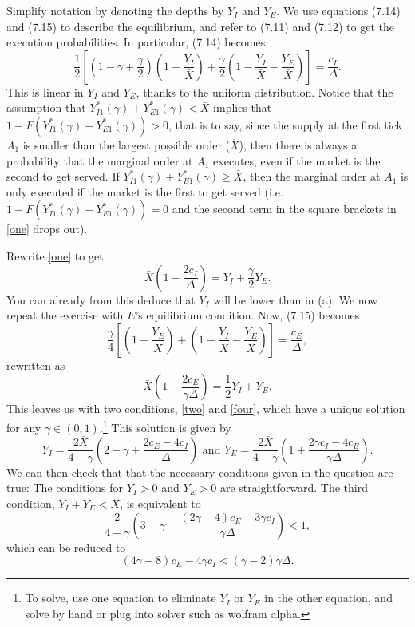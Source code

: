 \documentclass[11pt
, answers
]{exam}
\begin{document}
\begin{enumerate}[label=(\alph*). ]
	\begin{solution}
		Simplify notation by denoting the depths by $Y_{I}$ and $Y_{E}$. We use equations (7.14) and (7.15) to describe the equilibrium, and refer to (7.11) and (7.12) to get the execution probabilities. In particular, (7.14) becomes
		\begin{equation} \label{one}
			\frac{1}{2} \left[ \left( 1-\gamma+\frac{\gamma}{2}\right)\left(1-\frac{Y_{I}}{\bar{X}}\right)+\frac{\gamma}{2}\left(1-\frac{Y_{I}}{\bar{X}}-\frac{Y_{E}}{\bar{X}}\right)\right] = \frac{c_{I}}{\Delta}.
		\end{equation}
		This is linear in $Y_{I}$ and $Y_{E}$, thanks to the uniform distribution. Notice that the assumption that $Y^{*}_{I1}(\gamma)+Y^{*}_{E1}(\gamma)<\bar{X}$ implies that $1-F(Y^{*}_{I1}(\gamma)+Y^{*}_{E1}(\gamma))>0$, that is to say, since the supply at the first tick $A_1$ is smaller than the largest possible order ($\overline{X}$), then there is always a probability that the marginal order at $A_1$ executes, even if the market is the second to get served. If $Y^{*}_{I1}(\gamma)+Y^{*}_{E1}(\gamma) \ge \bar{X}$, then the marginal order at $A_1$ is only executed if the market is the first to get served (i.e. $1-F(Y^{*}_{I1}(\gamma)+Y^{*}_{E1}(\gamma))=0$ and the second term in the square brackets in \eqref{one} drops out).
		
		Rewrite \eqref{one} to get
		\begin{equation} \label{two}
			\bar{X} \left(1-\frac{2c_{I}}{\Delta} \right) = Y_{I} + \frac{\gamma}{2} Y_{E}.
		\end{equation}
		You can already from this deduce that $Y_{I}$ will be lower than in (a). We now repeat the exercise with $E$'s equilibrium condition. Now, (7.15) becomes
		\begin{equation} \label{three}
			\frac{\gamma}{4} \left[ \left(1-\frac{Y_{E}}{\bar{X}} \right) + \left(1-\frac{Y_{I}}{\bar{X}}-\frac{Y_{E}}{\bar{X}}\right)\right] = \frac{c_{E}}{\Delta},
		\end{equation}
		rewritten as
		\begin{equation} \label{four}
			\bar{X}\left(1-\frac{2c_{E}}{\gamma \Delta}\right) = \frac{1}{2} Y_{I}+Y_{E}.
		\end{equation}
		This leaves us with two conditions, \eqref{two} and \eqref{four}, which have a unique solution for any $\gamma \in (0,1)$.\footnote{To solve, use one equation to eliminate $Y_I$ or $Y_E$ in the other equation, and solve by hand or plug into solver such as wolfram alpha.} This solution is given by
		\[
		Y_{I} = \frac{2 \bar{X}}{4-\gamma} \left(2-\gamma+\frac{2c_{E}-4c_{I}}{\Delta} \right) \text{ and } Y_{E}=\frac{2\bar{X}}{4-\gamma}\left(1+\frac{2\gamma c_{I}-4c_{E}}{\gamma \Delta} \right).
		\]
		We can then check that that the necessary conditions given in the question are true: The conditions for $Y_{I}>0$ and $Y_{E}>0$ are straightforward. The third condition, $Y_{I}+Y_{E}<\bar{X}$, is equivalent to
		\[
		\frac{2}{4-\gamma} \left(3-\gamma + \frac{(2\gamma-4)c_{E}-3\gamma c_{I}}{\gamma \Delta} \right) < 1,
		\]
		which can be reduced to
		\[
		(4\gamma-8)c_{E} - 4\gamma c_{I} < (\gamma-2) \gamma \Delta.
		\]
	\end{solution}
	

\end{enumerate}
\end{document}
